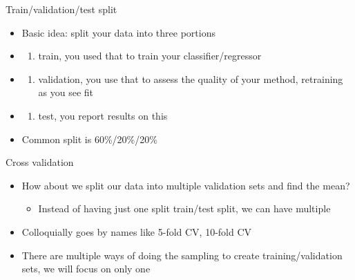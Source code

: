 \documentclass[obeyspaces,aspectratio=43]{beamer}
\providecommand{\tightlist}{%
  \setlength{\itemsep}{0pt}\setlength{\parskip}{0pt}}
\begin{document}
\begin{frame}{Train/validation/test split}

\begin{itemize}
\item
  Basic idea: split your data into three portions
\item
  \begin{enumerate}
  \def\labelenumi{(\alph{enumi})}
  \tightlist
  \item
    train, you used that to train your classifier/regressor
  \end{enumerate}
\item
  \begin{enumerate}
  \def\labelenumi{(\alph{enumi})}
  \setcounter{enumi}{1}
  \tightlist
  \item
    validation, you use that to assess the quality of your method,
    retraining as you see fit
  \end{enumerate}
\item
  \begin{enumerate}
  \def\labelenumi{(\alph{enumi})}
  \setcounter{enumi}{2}
  \tightlist
  \item
    test, you report results on this
  \end{enumerate}
\item
  Common split is 60\%/20\%/20\%
\end{itemize}

\end{frame}

\begin{frame}{Cross validation}

\begin{itemize}
\tightlist
\item
  How about we split our data into multiple validation sets and find the
  mean?

  \begin{itemize}
  \tightlist
  \item
    Instead of having just one split train/test split, we can have
    multiple
  \end{itemize}
\item
  Colloquially goes by names like 5-fold CV, 10-fold CV
\item
  There are multiple ways of doing the sampling to create
  training/validation sets, we will focus on only one
\end{itemize}

\end{frame}
\end{document}
